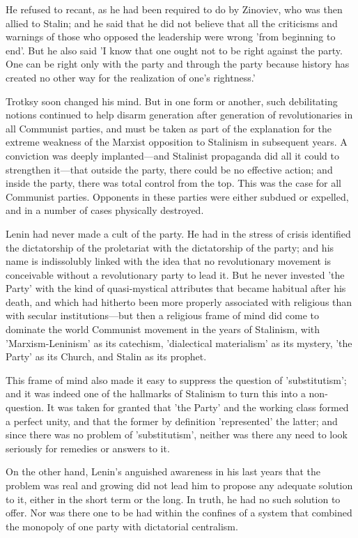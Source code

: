 He refused to recant, as he had been required to do by Zinoviev, who was then allied to Stalin; and he said that he did not believe that all the criticisms and warnings of those who opposed the leadership were wrong 'from beginning to end'. But he also said 'I know that one ought not to be right against the party. One can be right only with the party and through the party because history has created no other way for the realization of one's rightness.'

Trotksy soon changed his mind. But in one form or another, such debilitating notions continued to help disarm generation after generation of revolutionaries in all Communist parties, and must be taken as part of the explanation for the extreme weakness of the Marxist opposition to Stalinism in subsequent years. A conviction was deeply implanted—and Stalinist propaganda did all it could to strengthen it—that outside the party, there could be no effective action; and inside the party, there was total control from the top. This was the case for all Communist parties. Opponents in these parties were either subdued or expelled, and in a number of cases physically destroyed.

Lenin had never made a cult of the party. He had in the stress of crisis identified the dictatorship of the proletariat with the dictatorship of the party; and his name is indissolubly linked with the idea that no revolutionary movement is conceivable without a revolutionary party to lead it. But he never invested 'the Party' with the kind of quasi-mystical attributes that became habitual after his death, and which had hitherto been more properly associated with religious than with secular institutions—but then a religious frame of mind did come to dominate the world Communist movement in the years of Stalinism, with 'Marxism-Leninism' as its catechism, 'dialectical materialism' as its mystery, 'the Party' as its Church, and Stalin as its prophet.

This frame of mind also made it easy to suppress the question of 'substitutism'; and it was indeed one of the hallmarks of Stalinism to turn this into a non-question. It was taken for granted that 'the Party' and the working class formed a perfect unity, and that the former by definition 'represented' the latter; and since there was no problem of 'substitutism', neither was there any need to look seriously for remedies or answers to it.

On the other hand, Lenin's anguished awareness in his last years that the problem was real and growing did not lead him to propose any adequate solution to it, either in the short term or the long. In truth, he had no such solution to offer. Nor was there one to be had within the confines of a system that combined the monopoly of one party with dictatorial centralism.

